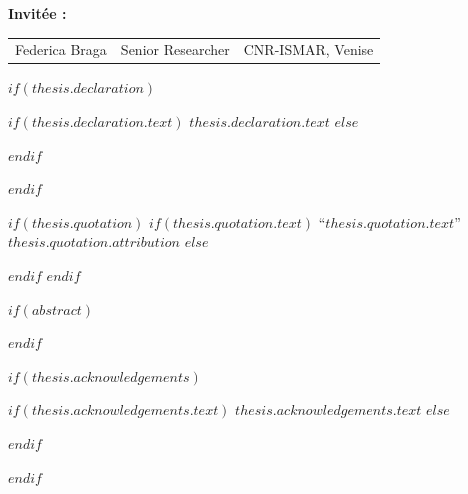 \begin{titlepage}
{\fontsize{11}{15}\selectfont \textbf{Invitée : }}


\begin{tabular}{@{}l l l@{}}
    {\fontsize{10}{14}\selectfont \textcolor{textgray}{Federica Braga}} & 
    {\fontsize{10}{14}\selectfont \textcolor{textgray}{Senior Researcher}} & 
    {\fontsize{10}{14}\selectfont \textcolor{textgray}{CNR-ISMAR, Venise}} \\

\end{tabular}
\end{titlepage}

\restoregeometry

\renewcommand{\familydefault}{\rmdefault}


$if(thesis.declaration)$
  \begin{declaration}
    \addchaptertocentry{\authorshipname} %
    $if(thesis.declaration.text)$
      $thesis.declaration.text$
    $else$
      
    $endif$
  \end{declaration}
  \cleardoublepage
$endif$

$if(thesis.quotation)$
  \vspace*{0.2\textheight}
  $if(thesis.quotation.text)$
    \noindent``{\itshape $thesis.quotation.text$}''\bigbreak
    \hfill $thesis.quotation.attribution$
  $else$
    
  $endif$
$endif$

$if(abstract)$
  \clearpage
  \begin{abstract}
    \addchaptertocentry{\abstractname} %
    $abstract$
  \end{abstract}
$endif$

$if(thesis.acknowledgements)$
  \begin{acknowledgements}
    \addchaptertocentry{\acknowledgementname} %
    $if(thesis.acknowledgements.text)$
      $thesis.acknowledgements.text$
    $else$
      
    $endif$
  \end{acknowledgements}
$endif$

